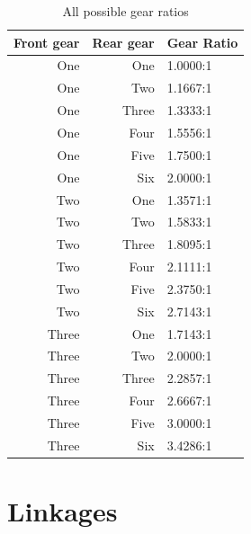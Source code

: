 \documentclass[11pt]{article}
\begin{document}
\begin{table}[H]
	\centering
	\begin{tabular}{|r|r|l|}
		\hline
		\textbf{Front gear} & \textbf{Rear gear} & \textbf{Gear Ratio} \\
		\hline
		One & One & 1.0000:1 \\
		One & Two & 1.1667:1 \\
		One & Three & 1.3333:1 \\
		One & Four & 1.5556:1 \\
		One & Five & 1.7500:1 \\
		One & Six & 2.0000:1 \\
		\hline
		Two & One & 1.3571:1 \\
		Two & Two & 1.5833:1 \\
		Two & Three & 1.8095:1 \\
		Two & Four & 2.1111:1 \\
		Two & Five & 2.3750:1 \\
		Two & Six & 2.7143:1 \\
		\hline
		Three & One & 1.7143:1 \\
		Three & Two & 2.0000:1 \\
		Three & Three & 2.2857:1 \\
		Three & Four & 2.6667:1 \\
		Three & Five & 3.0000:1 \\
		Three & Six & 3.4286:1 \\
		\hline
	\end{tabular}
	\caption{All possible gear ratios}
\end{table}

\section*{Linkages}
\end{document}
